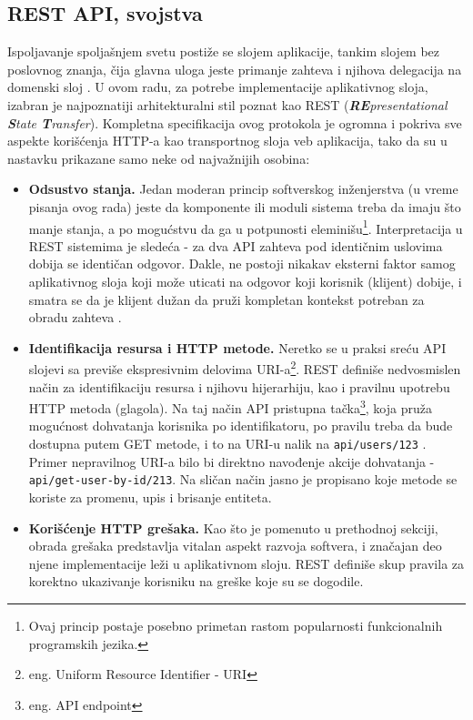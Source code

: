 \documentclass[12pt,oneside]{memoir}
\begin{document}
\subsection{REST API, svojstva}
\label{sec:restapi}

Ispoljavanje spoljašnjem svetu postiže se slojem aplikacije, tankim slojem bez poslovnog znanja, čija glavna uloga jeste primanje zahteva i njihova delegacija na domenski sloj \cite{dddfull}. U ovom radu, za potrebe implementacije aplikativnog sloja, izabran je najpoznatiji arhitekturalni stil poznat kao REST (\textit{\textbf{RE}presentational \textbf{S}tate \textbf{T}ransfer}). Kompletna specifikacija ovog protokola je ogromna i pokriva sve aspekte korišćenja HTTP-a kao transportnog sloja veb aplikacija, tako da su u nastavku prikazane samo neke od najvažnijih osobina:

\begin{itemize}
    \item \textbf{Odsustvo stanja.} Jedan moderan princip softverskog inženjerstva (u vreme pisanja ovog rada) jeste da komponente ili moduli sistema treba da imaju što manje stanja, a po mogućstvu da ga u potpunosti eleminišu\footnote{Ovaj princip postaje posebno primetan rastom popularnosti funkcionalnih programskih jezika.}. Interpretacija u REST sistemima je sledeća - za dva API zahteva pod identičnim uslovima dobija se identičan odgovor. Dakle, ne postoji nikakav eksterni faktor samog aplikativnog sloja koji može uticati na odgovor koji korisnik (klijent) dobije, i smatra se da je klijent dužan da pruži kompletan kontekst potreban za obradu zahteva \cite{restapi}.

    \item \textbf{Identifikacija resursa i HTTP metode.} Neretko se u praksi sreću API slojevi sa previše ekspresivnim delovima URI-a\footnote{eng. Uniform Resource Identifier - URI}. REST definiše nedvosmislen način za identifikaciju resursa i njihovu hijerarhiju, kao i pravilnu upotrebu HTTP metoda (glagola). Na taj način API pristupna tačka\footnote{eng. API endpoint}, koja pruža mogućnost dohvatanja korisnika po identifikatoru, po pravilu treba da bude dostupna putem GET metode, i to na URI-u nalik na \verb|api/users/123| \cite{restapi}. Primer nepravilnog URI-a bilo bi direktno navođenje akcije dohvatanja - \verb|api/get-user-by-id/213|. Na sličan način jasno je propisano koje metode se koriste za promenu, upis i brisanje entiteta.

    \item \textbf{Korišćenje HTTP grešaka.} Kao što je pomenuto u prethodnoj sekciji, obrada grešaka predstavlja vitalan aspekt razvoja softvera, i značajan deo njene implementacije leži u aplikativnom sloju. REST definiše skup pravila za korektno ukazivanje korisniku na greške koje su se dogodile.  
\end{itemize}
\end{document}
